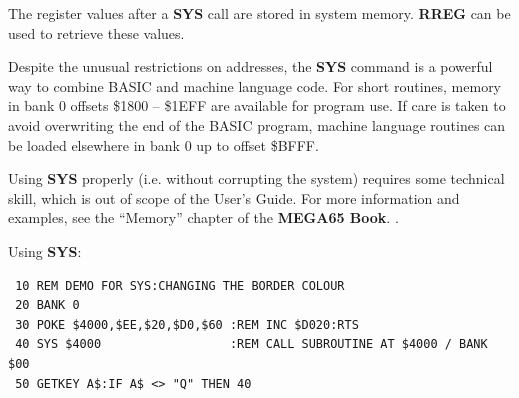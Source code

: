 \begin{description}[leftmargin=2cm,style=nextline]
\item [Remarks:] The register values after a {\bf SYS} call are stored
                 in system memory. {\bf RREG} can be used to retrieve these values.

                 Despite the unusual restrictions on addresses, the {\bf SYS}
                 command is a powerful way to combine BASIC and machine
                 language code. For short routines, memory in bank 0 offsets
                 \$1800 -- \$1EFF are available for program use. If care is
                 taken to avoid overwriting the end of the BASIC program,
                 machine language routines can be loaded elsewhere in bank 0
                 up to offset \$BFFF.

                 Using {\bf SYS} properly (i.e. without corrupting the system)
                 requires some technical skill, which is out of scope of the User's Guide.
                 For more information and examples, see
\ifdefined\printmanual
the ``Memory'' chapter of the {\bf MEGA65 Book}.
\else
{}.
\fi

\item [Example:] Using {\bf SYS}:
\begin{tcolorbox}[colback=black,coltext=white]
\verbatimfont{\codefont}
\begin{verbatim}
 10 REM DEMO FOR SYS:CHANGING THE BORDER COLOUR
 20 BANK 0
 30 POKE $4000,$EE,$20,$D0,$60 :REM INC $D020:RTS
 40 SYS $4000                  :REM CALL SUBROUTINE AT $4000 / BANK $00
 50 GETKEY A$:IF A$ <> "Q" THEN 40
\end{verbatim}
\end{tcolorbox}

\end{description}



\newpage
